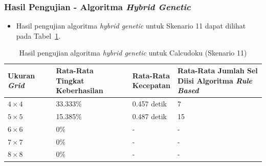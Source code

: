 \documentclass{beamer}
\begin{document}
\begin{frame}
\frametitle{Hasil Pengujian - Algoritma \textit{Hybrid Genetic}}
\begin{itemize}
\item Hasil pengujian algoritma \textit{hybrid genetic} untuk Skenario 11 dapat dilihat pada Tabel~\ref{tab:pengujianhg11}.
\end{itemize}
\begin{table}
\tiny
\centering
\captionsetup{justification=centering}
\caption[Hasil pengujian algoritma \textit{hybrid genetic} untuk Calcudoku (Skenario 11)]{Hasil pengujian algoritma \textit{hybrid genetic} untuk Calcudoku (Skenario 11)}
\begin{tabular}{| l | l | l | l |}
\hline
Ukuran \textit{Grid} & \makecell[c]{Rata-Rata \\ Tingkat Keberhasilan} & \makecell[c]{Rata-Rata \\ Kecepatan} & \makecell[c]{Rata-Rata Jumlah Sel \\ Diisi Algoritma \textit{Rule Based}} \\
\hline \hline
\begin{math}4 \times 4\end{math} & 33.333\% & 0.457 detik & 7 \\
\hline
\begin{math}5 \times 5\end{math} & 15.385\% & 0.487 detik & 15 \\
\hline
\begin{math}6 \times 6\end{math} & 0\% & - & - \\
\hline
\begin{math}7 \times 7\end{math} & 0\% & - & - \\
\hline
\begin{math}8 \times 8\end{math} & 0\% & - & - \\
\hline
\end{tabular}
\label{tab:pengujianhg11}
\end{table}
\end{frame}

\end{document}

